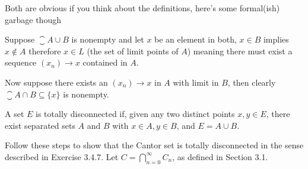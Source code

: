 \begin{solution}
  Both are obvious if you think about the definitions, here's some formal(ish) garbage though

  Suppose $\closure{A} \cup B$ is nonempty and let $x$ be an element in both, $x \in B$ implies $x \notin A$ therefore $x \in L$ (the set of limit points of $A$) meaning there must exist a sequence $(x_n) \to x$ contained in $A$.

  Now suppose there exists an $(x_n) \to x$ in $A$ with limit in $B$, then clearly $\closure{A} \cap B \subseteq \{x\}$ is nonempty.
\end{solution}

\begin{exercise}
  A set $E$ is totally disconnected if, given any two distinct points $x, y \in E$, there exist separated sets $A$ and $B$ with $x \in A, y \in B$, and $E=A \cup B$.
\end{exercise}

\begin{solution}
\end{solution}

\begin{exercise}
  Follow these steps to show that the Cantor set is totally disconnected in the sense described in Exercise 3.4.7.
  Let $C=\bigcap_{n=0}^{\infty} C_{n}$, as defined in Section 3.1.
\end{exercise}

